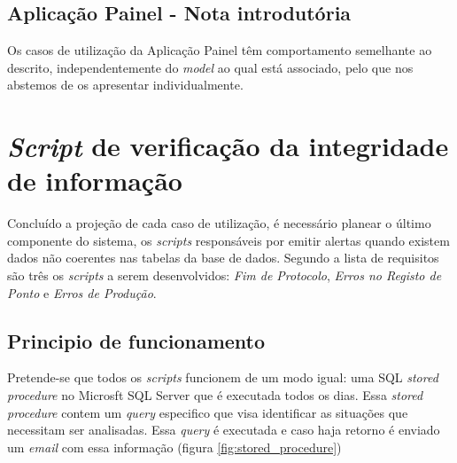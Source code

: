 
\newpage

\newpage

\newpage

\newpage

\newpage

\newpage

\newpage

\newpage

\subsection{Aplicação Painel - Nota introdutória}
Os casos de utilização da Aplicação Painel têm comportamento semelhante ao descrito, independentemente do \textit{model} ao qual está associado, pelo que nos abstemos de os apresentar individualmente.


\newpage

\newpage

\newpage

\newpage

\newpage

\newpage

\newpage

\section{\textit{Script} de verificação da integridade de informação}
Concluído a projeção de cada caso de utilização, é necessário planear o último componente do sistema, os \textit{scripts} responsáveis por emitir alertas quando existem dados não coerentes nas tabelas da base de dados. Segundo a lista de requisitos são três os \textit{scripts} a serem desenvolvidos: \textit{Fim de Protocolo}, \textit{Erros no Registo de Ponto} e \textit{Erros de Produção}.

\subsection{Principio de funcionamento}
Pretende-se que todos os \textit{scripts} funcionem de um modo igual: uma SQL \textit{stored procedure} no Microsft SQL Server que é executada todos os dias. Essa \textit{stored procedure} contem um \textit{query} especifico que visa identificar as situações que necessitam ser analisadas. Essa \textit{query} é executada e caso haja retorno é enviado um \textit{email} com essa informação (figura \ref{fig:stored_procedure})

